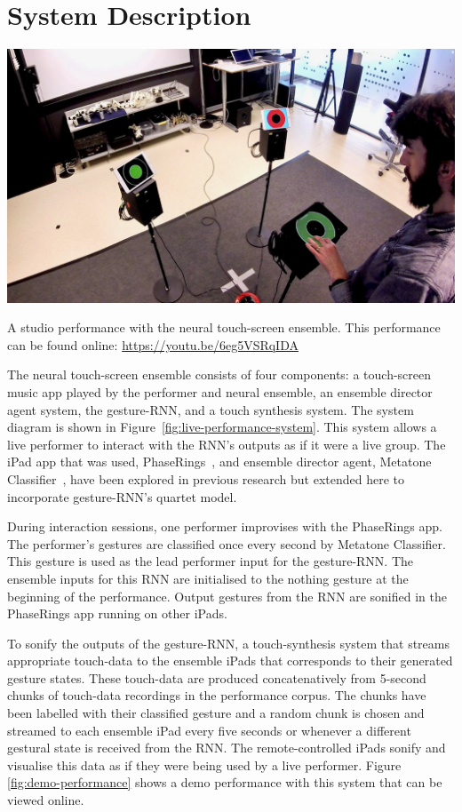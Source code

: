 \documentclass[sigchi-a, authorversion]{acmart}
\begin{document}
\section{System Description}

\begin{marginfigure}
    \includegraphics[width=\marginparwidth]{neural-ipad-ensemble-demo-screen}
    \caption{A studio performance with the neural touch-screen
      ensemble. This performance can be found online: \url{https://youtu.be/6eg5VSRqIDA}}
    \label{fig:demo-performance}
\end{marginfigure}

The neural touch-screen ensemble consists of four components: a
touch-screen music app played by the performer and neural ensemble, an
ensemble director agent system, the gesture-RNN, and a touch synthesis
system. The system diagram is shown in
Figure~\ref{fig:live-performance-system}. This system allows a live
performer to interact with the RNN's outputs as if it were a live
group. The iPad app that was used, PhaseRings~\cite{Martin:2016ah},
and ensemble director agent, Metatone Classifier~\cite{Martin:2016xu},
have been explored in previous research but extended here to
incorporate gesture-RNN's quartet model.

During interaction sessions, one performer improvises with the
PhaseRings app. The performer's gestures are classified once every
second by Metatone Classifier. This gesture is used as the lead
performer input for the gesture-RNN. The ensemble inputs for this RNN
are initialised to the nothing gesture at the beginning of the
performance. Output gestures from the RNN are sonified in the
PhaseRings app running on other iPads.

To sonify the outputs of the gesture-RNN, a touch-synthesis system
that streams appropriate touch-data to the ensemble iPads that
corresponds to their generated gesture states. These touch-data are
produced concatenatively from 5-second chunks of touch-data recordings
in the performance corpus. The chunks have been labelled with their
classified gesture and a random chunk is chosen and streamed to each
ensemble iPad every five seconds or whenever a different gestural
state is received from the RNN. The remote-controlled iPads sonify and
visualise this data as if they were being used by a live performer.
Figure \ref{fig:demo-performance} shows a demo performance with this
system that can be viewed online.
\end{document}
